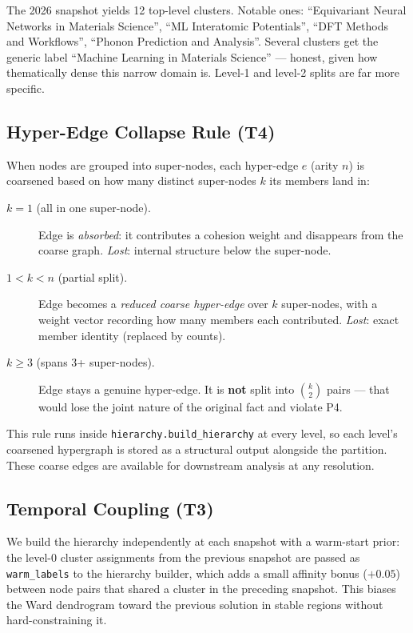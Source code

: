 \documentclass[10pt]{article}
\begin{document}
The 2026 snapshot yields 12 top-level clusters.
Notable ones: ``Equivariant Neural Networks in Materials Science'',
``ML Interatomic Potentials'', ``DFT Methods and Workflows'', ``Phonon Prediction
and Analysis''.
Several clusters get the generic label ``Machine Learning in Materials Science'' —
honest, given how thematically dense this narrow domain is.
Level-1 and level-2 splits are far more specific.

\subsection{Hyper-Edge Collapse Rule (T4)}\label{sec:t4}

When nodes are grouped into super-nodes, each hyper-edge $e$ (arity $n$) is
coarsened based on how many distinct super-nodes $k$ its members land in:

\begin{description}
  \item[\textbf{$k=1$} (all in one super-node).] Edge is \emph{absorbed}:
    it contributes a cohesion weight and disappears from the coarse graph.
    \emph{Lost}: internal structure below the super-node.
  \item[\textbf{$1 < k < n$} (partial split).] Edge becomes a \emph{reduced
    coarse hyper-edge} over $k$ super-nodes, with a weight vector recording
    how many members each contributed.
    \emph{Lost}: exact member identity (replaced by counts).
  \item[\textbf{$k \ge 3$} (spans 3+ super-nodes).] Edge stays a genuine
    hyper-edge. It is \textbf{not} split into $\binom{k}{2}$ pairs — that would
    lose the joint nature of the original fact and violate P4.
\end{description}

This rule runs inside \texttt{hierarchy.build\_hierarchy} at every level, so
each level's coarsened hypergraph is stored as a structural output alongside the
partition.  These coarse edges are available for downstream analysis at any
resolution.

\subsection{Temporal Coupling (T3)}\label{sec:t3}

We build the hierarchy independently at each snapshot with a warm-start prior:
the level-0 cluster assignments from the previous snapshot are passed as
\texttt{warm\_labels} to the hierarchy builder, which adds a small affinity bonus
($+0.05$) between node pairs that shared a cluster in the preceding snapshot.
This biases the Ward dendrogram toward the previous solution in stable regions
without hard-constraining it.
\end{document}
